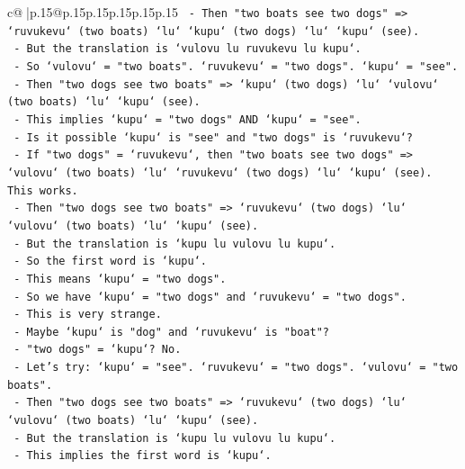 \documentclass{article}
\begin{document}
{\begin{supertabular}{c@{$\;$}|p{.15\linewidth}@{}p{.15\linewidth}p{.15\linewidth}p{.15\linewidth}p{.15\linewidth}p{.15\linewidth}}
{{{\texttt{                       {-} Then "two boats see two dogs" => `ruvukevu` (two boats) `lu` `kupu` (two dogs) `lu` `kupu` (see).} \\
\texttt{                       {-} But the translation is `vulovu lu ruvukevu lu kupu`.} \\
\texttt{                       {-} So `vulovu` = "two boats". `ruvukevu` = "two dogs". `kupu` = "see".} \\
\texttt{                       {-} Then "two dogs see two boats" => `kupu` (two dogs) `lu` `vulovu` (two boats) `lu` `kupu` (see).} \\
\texttt{                       {-} This implies `kupu` = "two dogs" AND `kupu` = "see".} \\
\texttt{                       {-} Is it possible `kupu` is "see" and "two dogs" is `ruvukevu`?} \\
\texttt{                       {-} If "two dogs" = `ruvukevu`, then "two boats see two dogs" => `vulovu` (two boats) `lu` `ruvukevu` (two dogs) `lu` `kupu` (see). This works.} \\
\texttt{                       {-} Then "two dogs see two boats" => `ruvukevu` (two dogs) `lu` `vulovu` (two boats) `lu` `kupu` (see).} \\
\texttt{                       {-} But the translation is `kupu lu vulovu lu kupu`.} \\
\texttt{                       {-} So the first word is `kupu`.} \\
\texttt{                       {-} This means `kupu` = "two dogs".} \\
\texttt{                       {-} So we have `kupu` = "two dogs" and `ruvukevu` = "two dogs".} \\
\texttt{                       {-} This is very strange.} \\
\texttt{                       {-} Maybe `kupu` is "dog" and `ruvukevu` is "boat"?} \\
\texttt{                       {-} "two dogs" = `kupu`? No.} \\
\texttt{                       {-} Let's try: `kupu` = "see". `ruvukevu` = "two dogs". `vulovu` = "two boats".} \\
\texttt{                       {-} Then "two dogs see two boats" => `ruvukevu` (two dogs) `lu` `vulovu` (two boats) `lu` `kupu` (see).} \\
\texttt{                       {-} But the translation is `kupu lu vulovu lu kupu`.} \\
\texttt{                       {-} This implies the first word is `kupu`.} \\
}}}
\end{supertabular}}
\end{document}
